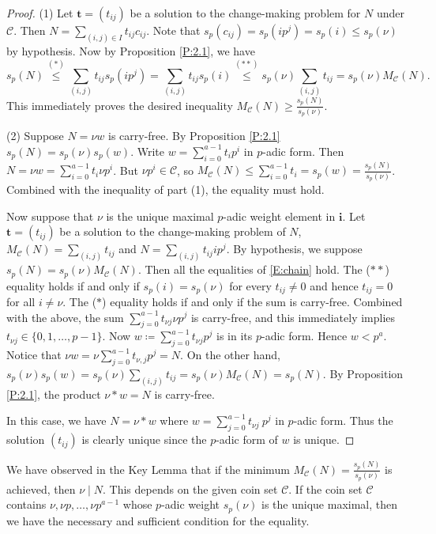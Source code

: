 \documentclass{amsart}
\numberwithin{equation}{section}
\newcommand{\cC}{\mathcal{C}}
\newcommand{\bi}{\mathbf{i}}
\newcommand{\bt}{\mathbf{t}}
\theoremstyle{plain}
\theoremstyle{definition}
\begin{document}
\begin{proof}      
(1) Let $\bt = (t_{ij})$ 
be a solution to the change-making problem for $N$ under $\cC$.
Then $N=\sum_{(i,j)\in I}t_{ij}c_{ij}$.
Note that $s_p(c_{ij}) = s_p(ip^j) = s_p(i) \le s_p(\nu)$
by hypothesis. 
Now by Proposition \ref{P:2.1},
we have 
\begin{equation}\label{E:chain}
s_p(N)\stackrel{(*)}{\le} \sum_{(i,j)}t_{ij}s_p(ip^j)=\sum_{(i,j)}t_{ij}s_p(i)
\stackrel{(**)}{\le} s_p(\nu)\sum_{(i,j)}t_{ij}=s_p(\nu) M_\cC(N).
\end{equation}
This immediately proves the desired inequality   
$
M_\cC(N)\ge\frac{s_p(N)}{s_p(\nu)}.
$
      
(2) 
Suppose $N=\nu w$ is carry-free. By Proposition \ref{P:2.1} $s_p(N)=s_p(\nu)s_p(w)$.
Write $w=\sum_{i=0}^{a-1}t_ip^i$ in $p$-adic form.
Then $N = \nu w = \sum_{i=0}^{a-1} t_i \nu p^i$.
But $\nu p^i \in \cC$, so $M_\cC(N) \le \sum_{i=0}^{a-1} t_i = s_p(w) =
\frac{s_p(N)}{s_p(\nu)}$.  Combined with the inequality of part (1),
the equality must hold.

Now suppose that $\nu$ is the unique maximal $p$-adic weight element in $\bi$.
Let $\bt=(t_{ij})$ be a solution to the change-making problem of $N$, 
$M_\cC(N)=\sum_{(i,j)}t_{ij}$ and 
$N=\sum_{(i,j)}t_{ij}i p^j$.
By hypothesis, we suppose $s_p(N)=s_p(\nu)M_\cC(N)$. Then all the equalities of \eqref{E:chain} hold. 
The ($**$) equality holds if and only if $s_p(i)=s_p(\nu)$ for every $t_{ij}\ne 0$ and hence 
$t_{ij}=0$ for all $i\ne \nu$.
The ($*$) equality holds if and only if the sum is carry-free. Combined with the above, 
the sum $\sum_{j=0}^{a-1} t_{\nu j} \nu p^j$ is carry-free, and this immediately implies
$t_{\nu j}\in\{0,1,\ldots,p-1\}$.
Now  $w\coloneqq\sum_{j=0}^{a-1}t_{\nu j}p^j$ is in its $p$-adic form.
Hence $w<p^a$. Notice that $\nu w = \nu\sum_{j=0}^{a-1} t_{\nu,j}p^j=N$. 
On the other hand, $s_p(\nu)s_p(w)=s_p(\nu)\sum_{(i,j)}t_{ij}=s_p(\nu) M_\cC(N)=s_p(N)$.
By Proposition \ref{P:2.1}, the product $\nu * w = N$ is carry-free.

In this case, we have $N=\nu * w$ where $w=\sum_{j=0}^{a-1} t_{\nu j}\ p^j$ in $p$-adic form.
Thus the solution $(t_{ij})$ is clearly unique since the $p$-adic form of $w$ is unique.
\end{proof}

We have observed in the Key Lemma that if the minimum 
$M_\cC(N) = \frac{s_p(N)}{s_p(\nu)}$ is achieved, then $\nu\mid N$. This depends on the given coin set $\cC$. 
If the coin set $\cC$ contains  
$\nu,\nu p,\ldots, \nu p^{a-1}$ whose $p$-adic weight 
$s_p(\nu)$ is the unique maximal, then we have the necessary and sufficient condition for the equality.
\end{document}
